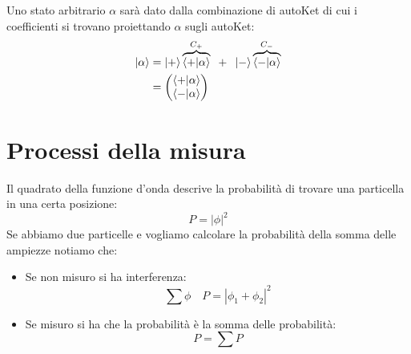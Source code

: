 \documentclass[a4paper]{article}
\begin{document}
\noindent
Uno stato arbitrario \( \alpha \) sarà dato dalla combinazione di autoKet di cui i coefficienti
si trovano proiettando \( \alpha \) sugli autoKet:
\[
  \begin{aligned}
    \ket{\alpha} &= \ket{+} \overbrace{\braket{+}{\alpha}}^{C_+} \;\; + \;\;
    \ket{-} \overbrace{\braket{-}{\alpha}}^{C_-}\\
                 &= \begin{pmatrix} 
                   \braket{+}{\alpha}\\
                   \braket{-}{\alpha}
                 \end{pmatrix} 
  \end{aligned}
\] 

\section{Processi della misura}
Il quadrato della funzione d'onda descrive la probabilità di trovare una particella in una
certa posizione:
\[
  P = |\phi|^2
\] 
Se abbiamo due particelle e vogliamo calcolare la probabilità della somma delle ampiezze
notiamo che:
\begin{itemize}
  \item Se non misuro si ha interferenza:
    \[
    \sum \phi \quad P = |\phi_1 + \phi_2|^2
    \] 

  \item Se misuro si ha che la probabilità è la somma delle probabilità:
    \[
      P = \sum P
    \]
\end{itemize}
\end{document}
